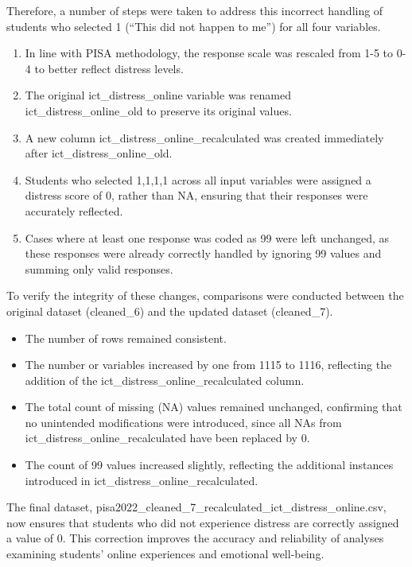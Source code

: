 \documentclass[
]{article}
\begin{document}
Therefore, a number of steps were taken to address this incorrect
handling of students who selected 1 (``This did not happen to me'') for
all four variables.

\begin{enumerate}
\def\labelenumi{\arabic{enumi}.}
\item
  In line with PISA methodology, the response scale was rescaled from
  1-5 to 0-4 to better reflect distress levels.
\item
  The original ict\_distress\_online variable was renamed
  ict\_distress\_online\_old to preserve its original values.
\item
  A new column ict\_distress\_online\_recalculated was created
  immediately after ict\_distress\_online\_old.
\item
  Students who selected 1,1,1,1 across all input variables were assigned
  a distress score of 0, rather than NA, ensuring that their responses
  were accurately reflected.
\item
  Cases where at least one response was coded as 99 were left unchanged,
  as these responses were already correctly handled by ignoring 99
  values and summing only valid responses.
\end{enumerate}

To verify the integrity of these changes, comparisons were conducted
between the original dataset (cleaned\_6) and the updated dataset
(cleaned\_7).

\begin{itemize}
\item
  The number of rows remained consistent.
\item
  The number or variables increased by one from 1115 to 1116, reflecting
  the addition of the ict\_distress\_online\_recalculated column.
\item
  The total count of missing (NA) values remained unchanged, confirming
  that no unintended modifications were introduced, since all NAs from
  ict\_distress\_online\_recalculated have been replaced by 0.
\item
  The count of 99 values increased slightly, reflecting the additional
  instances introduced in ict\_distress\_online\_recalculated.
\end{itemize}

The final dataset,
pisa2022\_cleaned\_7\_recalculated\_ict\_distress\_online.csv, now
ensures that students who did not experience distress are correctly
assigned a value of 0. This correction improves the accuracy and
reliability of analyses examining students' online experiences and
emotional well-being.
\end{document}
